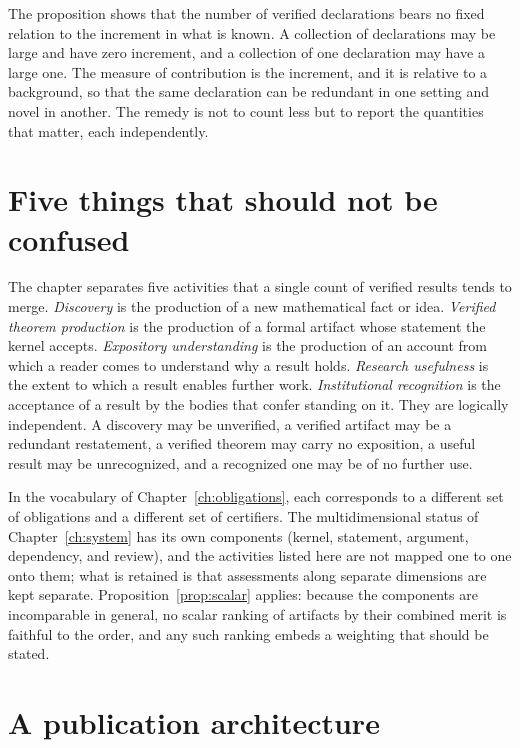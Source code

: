 The proposition shows that the number of verified declarations bears no fixed relation to the increment in what is known. A collection of declarations may be large and have zero increment, and a collection of one declaration may have a large one. The measure of contribution is the increment, and it is relative to a background, so that the same declaration can be redundant in one setting and novel in another. The remedy is not to count less but to report the quantities that matter, each independently.

\section{Five things that should not be confused}

The chapter separates five activities that a single count of verified results tends to merge. \emph{Discovery} is the production of a new mathematical fact or idea. \emph{Verified theorem production} is the production of a formal artifact whose statement the kernel accepts. \emph{Expository understanding} is the production of an account from which a reader comes to understand why a result holds. \emph{Research usefulness} is the extent to which a result enables further work. \emph{Institutional recognition} is the acceptance of a result by the bodies that confer standing on it. They are logically independent. A discovery may be unverified, a verified artifact may be a redundant restatement, a verified theorem may carry no exposition, a useful result may be unrecognized, and a recognized one may be of no further use.

In the vocabulary of Chapter~\ref{ch:obligations}, each corresponds to a different set of obligations and a different set of certifiers. The multidimensional status of Chapter~\ref{ch:system} has its own components (kernel, statement, argument, dependency, and review), and the activities listed here are not mapped one to one onto them; what is retained is that assessments along separate dimensions are kept separate. Proposition~\ref{prop:scalar} applies: because the components are incomparable in general, no scalar ranking of artifacts by their combined merit is faithful to the order, and any such ranking embeds a weighting that should be stated.

\section{A publication architecture}

